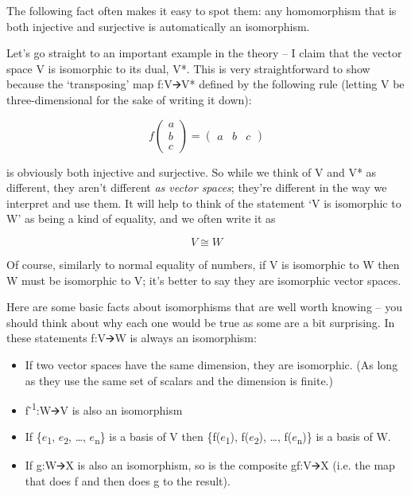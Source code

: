 \documentclass[oneside,english]{amsbook}
\numberwithin{section}{chapter}
\theoremstyle{plain}
\theoremstyle{definition}
\begin{document}
The following fact often makes it easy to spot them: any homomorphism
that is both injective and surjective is automatically an isomorphism.

Let's go straight to an important example in the theory -- I claim that
the vector space V is isomorphic to its dual, V*. This is very
straightforward to show because the `transposing' map f:V🡪V* defined
by the following rule (letting V be three-dimensional for the sake of
writing it down):

\[f\begin{pmatrix}
	a \\
	b \\
	c
\end{pmatrix} = \begin{pmatrix}
	a & b & c
\end{pmatrix}\]

is obviously both injective and surjective. So while we think of V and
V* as different, they aren't different \emph{as vector spaces}; they're
different in the way we interpret and use them. It will help to think of
the statement `V is isomorphic to W' as being a kind of equality, and
we often write it as

\[V \cong W\]

Of course, similarly to normal equality of numbers, if V is isomorphic
to W then W must be isomorphic to V; it's better to say they are
isomorphic vector spaces.

Here are some basic facts about isomorphisms that are well worth knowing
-- you should think about why each one would be true as some are a bit
surprising. In these statements f:V🡪W is always an isomorphism:

\begin{itemize}
	\item
	If two vector spaces have the same dimension, they are isomorphic. (As
	long as they use the same set of scalars and the dimension is finite.)
	\item
	f\textsuperscript{-1}:W🡪V is also an isomorphism
	\item
	If \{$e$\textsubscript{1}, $e$\textsubscript{2}, \ldots,
	$e$\textsubscript{n}\} is a basis of V then
	\{f($e$\textsubscript{1}), f($e$\textsubscript{2}), \ldots,
	f($e$\textsubscript{n})\} is a basis of W.
	\item
	If g:W🡪X is also an isomorphism, so is the composite gf:V🡪X (i.e. the
	map that does f and then does g to the result).
\end{itemize}
\end{document}
